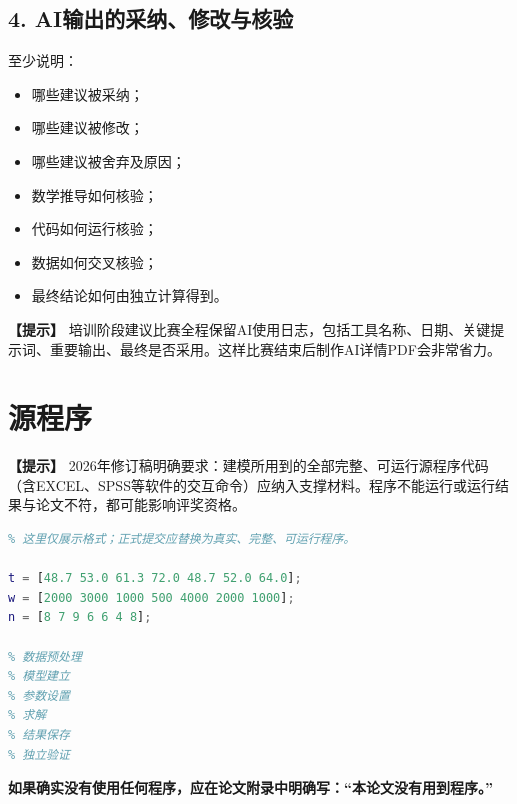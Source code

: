 \documentclass[12pt,a4paper]{article}
\newcommand{\tip}[1]{\par\noindent\textbf{【提示】} #1\par}
\begin{document}
\subsection*{4. AI输出的采纳、修改与核验}
至少说明：
\begin{itemize}
  \item 哪些建议被采纳；
  \item 哪些建议被修改；
  \item 哪些建议被舍弃及原因；
  \item 数学推导如何核验；
  \item 代码如何运行核验；
  \item 数据如何交叉核验；
  \item 最终结论如何由独立计算得到。
\end{itemize}

\tip{培训阶段建议比赛全程保留AI使用日志，包括工具名称、日期、关键提示词、重要输出、最终是否采用。这样比赛结束后制作AI详情PDF会非常省力。}

\section{源程序}

\tip{2026年修订稿明确要求：建模所用到的全部完整、可运行源程序代码（含EXCEL、SPSS等软件的交互命令）应纳入支撑材料。程序不能运行或运行结果与论文不符，都可能影响评奖资格。}

\begin{lstlisting}[language=matlab,caption={MATLAB完整程序示例}]
% 正式比赛时不要使用“略去”“省略代码”等写法。
% 这里仅展示格式；正式提交应替换为真实、完整、可运行程序。

t = [48.7 53.0 61.3 72.0 48.7 52.0 64.0];
w = [2000 3000 1000 500 4000 2000 1000];
n = [8 7 9 6 6 4 8];

% 数据预处理
% 模型建立
% 参数设置
% 求解
% 结果保存
% 独立验证
\end{lstlisting}

\begin{center}
\textbf{如果确实没有使用任何程序，应在论文附录中明确写：\quad“本论文没有用到程序。”}
\end{center}

\end{document}
